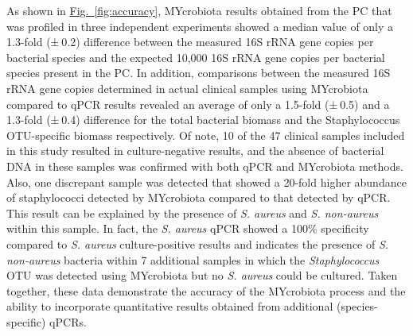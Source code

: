 As shown in \hyperref[fig:accuracy]{Fig.~\ref{fig:accuracy}}, MYcrobiota results obtained from the PC that was profiled in three independent experiments showed a median value of only a 1.3-fold (± 0.2) difference between the measured 16S rRNA gene copies per bacterial species and the expected 10,000 16S rRNA gene copies per bacterial species present in the PC\@. In addition, comparisons between the measured 16S rRNA gene copies determined in actual clinical samples using MYcrobiota compared to qPCR results revealed an average of only a 1.5-fold (± 0.5) and a 1.3-fold (± 0.4) difference for the total bacterial biomass and the Staphylococcus OTU-specific biomass respectively. Of note, 10 of the 47 clinical samples included in this study resulted in culture-negative results, and the absence of bacterial DNA in these samples was confirmed with both qPCR and MYcrobiota methods. Also, one discrepant sample was detected that showed a 20-fold higher abundance of staphylococci detected by MYcrobiota compared to that detected by qPCR\@. This result can be explained by the presence of \textit{S. aureus} and \textit{S. non-aureus} within this sample. In fact, the \textit{S. aureus} qPCR showed a 100\% specificity compared to \textit{S. aureus} culture-positive results and indicates the presence of \textit{S. non-aureus} bacteria within 7 additional samples in which the \textit{Staphylococcus} OTU was detected using MYcrobiota but no \textit{S. aureus} could be cultured. Taken together, these data demonstrate the accuracy of the MYcrobiota process and the ability to incorporate quantitative results obtained from additional (species-specific) qPCRs\@.



